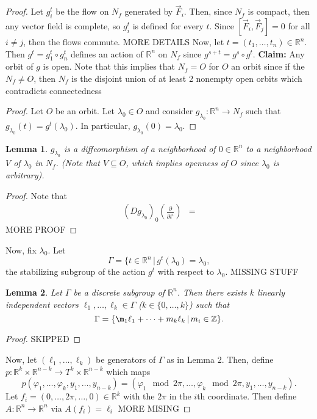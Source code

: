 \documentclass{article}
\newcommand{\R}{\mathbb R}
\newcommand{\Z}{\mathbb Z}
\newcommand{\nl}{\newline\newline\noindent}
\newcommand{\vhi}{\varphi}
\newcommand{\pd}[1]{\frac{\partial}{\partial #1}}
\newtheorem{lem}{Lemma}
\begin{document}
\begin{proof}
    Let $g_i^t$ be the flow on $N_f$ generated by $\vec F_i$. Then, since $N_f$ is compact, then any vector field is complete, so $g_i^t$ is defined for every $t$. Since $[\vec F_i,\vec F_j] = 0$ for all $i\neq j$, then the flows commute.
    MORE DETAILS 
    Now, let $t = (t_1,\dots,t_n)\in \R^n$. Then  $g^t = g_1^t\circ g_n^t$ defines an action of $\R^n$ on $N_f$ since $g^{s+t} = g^s\circ g^t$.
    \nl
    \textbf{Claim:} Any orbit of $g$ is open.
    \nl
    Note that this implies that $N_f = O$ for $O$ an orbit since if the $N_f\neq O$, then $N_f$ is the disjoint union of at least 2 nonempty open orbits which contradicts connectedness
    \begin{proof}
        Let $O$ be an orbit. Let $\lambda_0\in O$ and consider $g_{\lambda_0}:\R^n\to N_f$ such that $g_{\lambda_0}(t) = g^t(\lambda_0)$. In particular, $g_{\lambda_0}(0) = \lambda_0$.
    \end{proof}
    \begin{lem}
        $g_{\lambda_0}$ is a diffeomorphism of a neighborhood of $0\in\R^n$ to a neighborhood $V$ of $\lambda_0$ in $N_f$. (Note that $V\subseteq O$, which implies openness of $O$ since $\lambda_0$ is arbitrary).
    \end{lem}
    \begin{proof}
        Note that 
        \begin{align*}
            (Dg_{\lambda_0})_0\left(\pd{t^i}\right) &= 
        \end{align*}
        MORE PROOF
    \end{proof}
    Now, fix $\lambda_0$. Let
    \[\Gamma = \{t\in\R^n\,|\, g^t(\lambda_0) =\lambda_0,\]
    the stabilizing subgroup of the action $g^t$ with respect to $\lambda_0$.
    MISSING STUFF
    \begin{lem}
        Let $\Gamma$ be a discrete subgroup of $\R^n$. Then there exists $k$ linearly independent vectors $\ell_1,\dots,\ell_k\in \Gamma$ ($k\in\{0,\dots,k\}$) such that
        \[\Gamma = \{\m_1\ell_1 + \cdots+m_k\ell_k\,|\, m_i\in \Z\}.\]
    \end{lem}
    \begin{proof}
        SKIPPED
    \end{proof}
    Now, let $(\ell_1,\dots,\ell_k)$ be generators of $\Gamma$ as in Lemma 2. Then, define $p:\R^k\times \R^{n-k}\to T^k\times\R^{n-k}$ which maps
    \[p(\vhi_1,\dots,\vhi_k,y_1,\dots,y_{n-k}) = (\vhi_1\mod 2\pi,\dots,\vhi_k\mod 2\pi,y_1,\dots,y_{n-k}).\]
    Let $f_i = (0,\dots,2\pi,\dots,0)\in\R^k$ with the $2\pi$ in the $i$th coordinate. Then define $A:\R^n\to \R^n$ via $A(f_i) = \ell_i$ MORE MISING


\end{proof}
\end{document}
